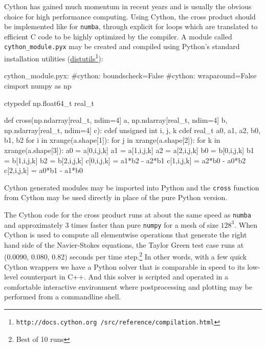 \documentclass[11pt, oneside]{article}
\newcommand{\inpyth}{\lstinline[keywordstyle={}, basicstyle=\ttfamily]} %[]%
\begin{document}
Cython has gained much momentum in recent years and is usually the obvious choice for high performance computing. Using Cython, the cross product should be implemented like for \inpyth{numba}, through explicit for loops which are translated to efficient C code to be highly optimized by the compiler. A module called \inpyth{cython_module.pyx} may be created and compiled using Python's standard installation utilities (\href{http://docs.cython.org /src/reference/compilation.html}{distutils}\footnote{\texttt{http://docs.cython.org /src/reference/compilation.html}}):

\begin{python}
cython_module.pyx:
#cython: boundscheck=False
#cython: wraparound=False
cimport numpy as np

ctypedef np.float64_t real_t

def cross(np.ndarray[real_t, ndim=4] a,
           np.ndarray[real_t, ndim=4] b,
           np.ndarray[real_t, ndim=4] c):
    cdef unsigned int i, j, k
    cdef real_t a0, a1, a2, b0, b1, b2
    for i in xrange(a.shape[1]):
        for j in xrange(a.shape[2]):
            for k in xrange(a.shape[3]):
                a0 = a[0,i,j,k]
                a1 = a[1,i,j,k]
                a2 = a[2,i,j,k]
                b0 = b[0,i,j,k]
                b1 = b[1,i,j,k]
                b2 = b[2,i,j,k]
                c[0,i,j,k] = a1*b2 - a2*b1
                c[1,i,j,k] = a2*b0 - a0*b2
                c[2,i,j,k] = a0*b1 - a1*b0

\end{python}
Cython generated modules may be imported into Python and the \inpyth{cross} function from Cython may be used directly in place of the pure Python version.

The Cython code for the cross product runs at about the same speed as \inpyth{numba} and approximately 3 times faster than pure \texttt{numpy} for a mesh of size $128^3$. When Cython is used to compute all elementwise operations that generate the right hand side of the Navier-Stokes equations, the Taylor Green test case runs at (0.0090, 0.080, 0.82) seconds per time step.\footnote{Best of 10 runs} In other words, with a few quick Cython wrappers we have a Python solver that is comparable in speed to its low-level counterpart in C++. And this solver is scripted and operated in a comfortable interactive environment where postprocessing and plotting may be performed from a commandline shell.
\end{document}
